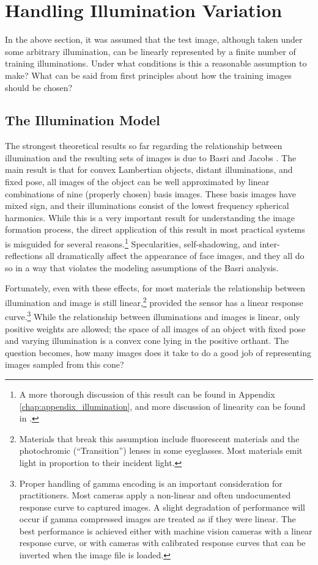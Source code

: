 \section{Handling Illumination Variation}
\label{sec:illumination}
In the above section, it was assumed that the test image, although taken under
some arbitrary illumination, can be linearly represented by a finite number of
training illuminations.  Under what conditions is this a reasonable assumption
to make?  What can be said from first principles about how the training images
should be chosen?

\subsection{The Illumination Model}
%
The strongest theoretical results so far regarding the relationship between
illumination and the resulting sets of images is due to Basri and Jacobs
\cite{Basri2003-PAMI}.  The main result is that for convex Lambertian objects,
distant illuminations, and fixed pose, all images of the object can be well
approximated by linear combinations of nine (properly chosen) basis images.
These basis images have mixed sign, and their illuminations consist of the
lowest frequency spherical harmonics.  While this is a very important result
for understanding the image formation process, the direct application of this
result in most practical systems is misguided for several reasons.\footnote{A more
thorough discussion of this result can be found in 
Appendix \ref{chap:appendix_illumination}, and more discussion of linearity can be found in
\cite{belhumeur1998set}.}
Specularities, self-shadowing, and
inter-reflections all dramatically affect the appearance of face images, and
they all do so in a way that violates the modeling assumptions of the Basri
analysis.

Fortunately, even with these effects, for most materials the relationship
between illumination and image is still linear,\footnote{Materials that break
this assumption include fluorescent materials and the photochromic
(``Transition'') lenses in some eyeglasses.  Most materials emit light in
proportion to their incident light.} provided the sensor has a linear response
curve.\footnote{Proper handling of gamma encoding is an important consideration
for practitioners.  Most cameras apply a non-linear and often undocumented
response curve to captured images.  A slight degradation of performance will
occur if gamma compressed images are treated as if they were linear.  The best
performance is achieved either with machine vision cameras with a linear
response curve, or with cameras with calibrated response curves that can be
inverted when the image file is loaded.} While the relationship between
illuminations and images is linear, only positive weights are allowed; the
space of all images of an object with fixed pose and varying illumination is a
convex cone lying in the positive orthant. The question becomes, how many
images does it take to do a good job of representing images sampled from this
cone?

